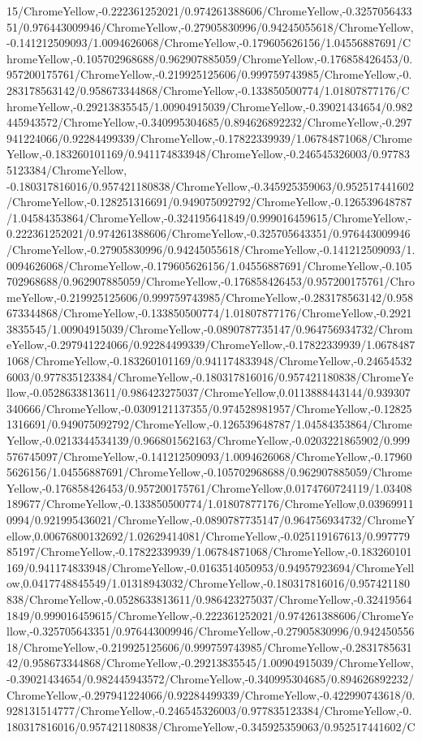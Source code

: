 {\begin{tikzternal}
{15/ChromeYellow,-0.222361252021/0.974261388606/ChromeYellow,-0.325705643351/0.976443009946/ChromeYellow,-0.27905830996/0.94245055618/ChromeYellow,-0.141212509093/1.0094626068/ChromeYellow,-0.179605626156/1.04556887691/ChromeYellow,-0.105702968688/0.962907885059/ChromeYellow,-0.176858426453/0.957200175761/ChromeYellow,-0.219925125606/0.999759743985/ChromeYellow,-0.283178563142/0.958673344868/ChromeYellow,-0.133850500774/1.01807877176/ChromeYellow,-0.29213835545/1.00904915039/ChromeYellow,-0.39021434654/0.982445943572/ChromeYellow,-0.340995304685/0.894626892232/ChromeYellow,-0.297941224066/0.92284499339/ChromeYellow,-0.17822339939/1.06784871068/ChromeYellow,-0.183260101169/0.941174833948/ChromeYellow,-0.246545326003/0.977835123384/ChromeYellow,
-0.180317816016/0.957421180838/ChromeYellow,-0.345925359063/0.952517441602/ChromeYellow,-0.128251316691/0.949075092792/ChromeYellow,-0.126539648787/1.04584353864/ChromeYellow,-0.324195641849/0.999016459615/ChromeYellow,-0.222361252021/0.974261388606/ChromeYellow,-0.325705643351/0.976443009946/ChromeYellow,-0.27905830996/0.94245055618/ChromeYellow,-0.141212509093/1.0094626068/ChromeYellow,-0.179605626156/1.04556887691/ChromeYellow,-0.105702968688/0.962907885059/ChromeYellow,-0.176858426453/0.957200175761/ChromeYellow,-0.219925125606/0.999759743985/ChromeYellow,-0.283178563142/0.958673344868/ChromeYellow,-0.133850500774/1.01807877176/ChromeYellow,-0.29213835545/1.00904915039/ChromeYellow,-0.0890787735147/0.964756934732/ChromeYellow,-0.297941224066/0.92284499339/ChromeYellow,-0.17822339939/1.06784871068/ChromeYellow,-0.183260101169/0.941174833948/ChromeYellow,-0.246545326003/0.977835123384/ChromeYellow,-0.180317816016/0.957421180838/ChromeYellow,-0.0528633813611/0.986423275037/ChromeYellow,0.0113888443144/0.939307340666/ChromeYellow,-0.0309121137355/0.974528981957/ChromeYellow,-0.128251316691/0.949075092792/ChromeYellow,-0.126539648787/1.04584353864/ChromeYellow,-0.0213344534139/0.966801562163/ChromeYellow,-0.0203221865902/0.999576745097/ChromeYellow,-0.141212509093/1.0094626068/ChromeYellow,-0.179605626156/1.04556887691/ChromeYellow,-0.105702968688/0.962907885059/ChromeYellow,-0.176858426453/0.957200175761/ChromeYellow,0.0174760724119/1.03408189677/ChromeYellow,-0.133850500774/1.01807877176/ChromeYellow,0.039699110994/0.921995436021/ChromeYellow,-0.0890787735147/0.964756934732/ChromeYellow,0.00676800132692/1.02629414081/ChromeYellow,-0.025119167613/0.99777985197/ChromeYellow,-0.17822339939/1.06784871068/ChromeYellow,-0.183260101169/0.941174833948/ChromeYellow,-0.0163514050953/0.94957923694/ChromeYellow,0.0417748845549/1.01318943032/ChromeYellow,-0.180317816016/0.957421180838/ChromeYellow,-0.0528633813611/0.986423275037/ChromeYellow,-0.324195641849/0.999016459615/ChromeYellow,-0.222361252021/0.974261388606/ChromeYellow,-0.325705643351/0.976443009946/ChromeYellow,-0.27905830996/0.94245055618/ChromeYellow,-0.219925125606/0.999759743985/ChromeYellow,-0.283178563142/0.958673344868/ChromeYellow,-0.29213835545/1.00904915039/ChromeYellow,-0.39021434654/0.982445943572/ChromeYellow,-0.340995304685/0.894626892232/ChromeYellow,-0.297941224066/0.92284499339/ChromeYellow,-0.422990743618/0.928131514777/ChromeYellow,-0.246545326003/0.977835123384/ChromeYellow,-0.180317816016/0.957421180838/ChromeYellow,-0.345925359063/0.952517441602/C}
\end{tikzternal}}
